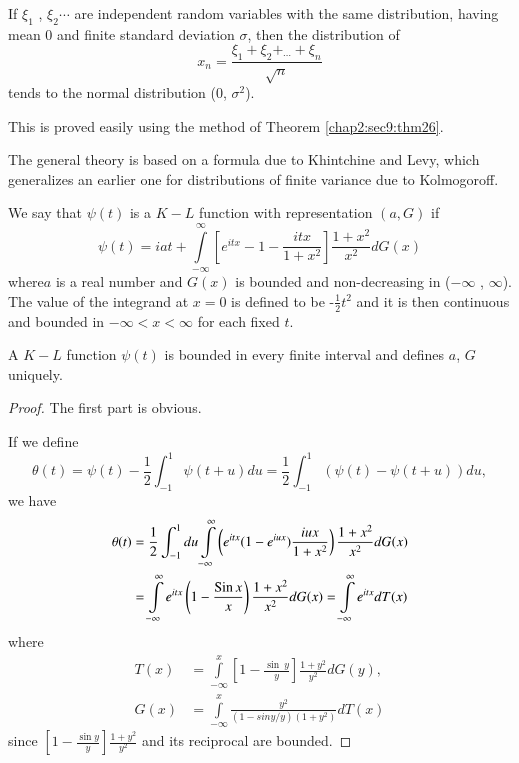 \begin{theorem}[De Moivre] \label{chap2:sec10:thm28}%
  If $\xi_1$ , $\xi_2 \cdots$ are independent random variables with the
  same distribution, having mean 0 and finite standard deviation
  $\sigma$, then the distribution of  
  $$ 
  x_n = \frac{\xi_1 + \xi_2 + _{\cdots} + \xi_n}{\sqrt{n}}
  $$ 
  tends to the normal distribution (0, $\sigma^2$).

  This is proved easily using the method of Theorem \ref{chap2:sec9:thm26}.
\end{theorem}

The general theory is based on a formula due to Khintchine and Levy,
which generalizes an earlier one for distributions of finite variance
due to Kolmogoroff.
	
We say that $\psi (t)$ is a $K-L$ function with representation $(a, G)$
if 
$$
\psi (t) = i a t + \int\limits^\infty_{-\infty}  \left[
  e^{itx}- 1 - \frac{itx}{1+x^2} \right] \frac{1+x^2}{x^2}dG(x)
$$
where\pageoriginale $a$ is a real number and $G(x)$ is bounded and non-decreasing in 
($- \infty$ , $\infty$). The value of the integrand at $x=0$ is defined to
be -$\frac{1}{2}t^2$ and it is then continuous and bounded in 
$-\infty < x < \infty$ for each fixed $t$.

\begin{theorem}\label{chap2:sec10:thm29} %
  A $K-L$ function $\psi (t)$ is bounded in every finite interval and
  defines $a$, $G$ uniquely. 
\end{theorem}

\begin{proof}
  The first part is obvious. 
  
  If we define
  $$
  \theta (t)  = \psi (t) -\frac{1}{2} \int_{-1}^1 \psi
  (t+u)du = \frac{1}{2} \int^1_{-1}(\psi(t)-\psi(t+u))du,
  $$
  we have
  \begin{align*}
    \theta(t)  & = \frac{1}{2} \int^1_{-1} du
    \int\limits_{-\infty}^\infty
    \left(e^{itx}(1-e^{iux})\frac{iux}{1+x^2}\right)\frac{1+x^2}{x^2}dG(x)\\ 
    & = \int\limits_{-\infty}^\infty e^{itx}\left( 1-\frac{\operatorname{Sin}
      x}{x} \right) \frac{1+x^2}{x^2} dG(x)=
    \int\limits_{-\infty}^\infty e^{itx} dT(x)
  \end{align*}
  where
  \begin{align*}
    T(x) & = \int\limits_{-\infty}^x  \left[ 1-\frac{\sin~ y}{y}
      \right] \frac{1+y^2}{y^2} dG(y) ,\\ 
    G(x) & = \int\limits_{-\infty}^x
    \frac{y^2}{(1-siny/y)(1+y^2)} dT(x) 
  \end{align*}
  since $\left[1-\frac{\sin y}{y}\right]\frac{1+y^2}{y^2}$ and its
  reciprocal are bounded. 
\end{proof}


